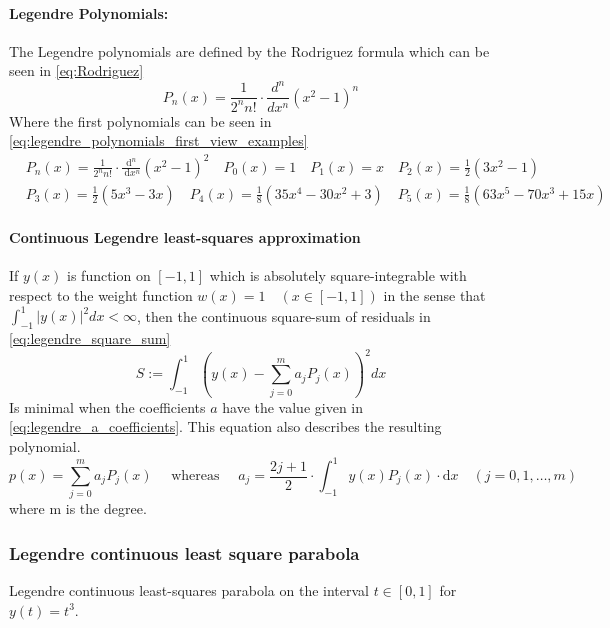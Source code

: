 \paragraph{Legendre Polynomials:}
The Legendre polynomials are defined by the Rodriguez formula which can be seen in \autoref{eq:Rodriguez}
\begin{equation}\label{eq:Rodriguez}
P_n(x)=\frac{1}{2^n n !} \cdot \frac{d^n}{d x^n}\left(x^2-1\right)^n
\end{equation}
Where the first polynomials can be seen in \autoref{eq:legendre_polynomials_first_view_examples}
\begin{equation}\label{eq:legendre_polynomials_first_view_examples}
    \begin{aligned}
    & P_{n}(x)=\frac{1}{2^{n} n !} \cdot \frac{\mathrm{d}^{n}}{\mathrm{~d} x^{n}}\left(x^{2}-1\right)^{2} \quad P_{0}(x)=1 \quad P_{1}(x)=x \quad P_{2}(x)=\frac{1}{2}\left(3 x^{2}-1\right) \\
    & P_{3}(x)=\frac{1}{2}\left(5 x^{3}-3 x\right) \quad P_{4}(x)=\frac{1}{8}\left(35 x^{4}-30 x^{2}+3\right) \quad P_{5}(x)=\frac{1}{8}\left(63 x^{5}-70 x^{3}+15 x\right)
    \end{aligned}
\end{equation}

\paragraph{Continuous Legendre least-squares approximation}\mbox{}\newline
If $y(x)$ is function on $[-1,1]$ which is absolutely square-integrable with respect to the weight function $w(x)=1 \quad(x \in[-1,1])$ in the sense that $\int_{-1}^1|y(x)|^2 d x<\infty$, then the continuous square-sum of residuals in \autoref{eq:legendre_square_sum}
\begin{equation}\label{eq:legendre_square_sum}
S:=\int_{-1}^1\left(y(x)-\sum_{j=0}^m a_j P_j(x)\right)^2 d x
\end{equation}
Is minimal when the coefficients $a$ have the value given in \autoref{eq:legendre_a_coefficients}. This equation also describes the resulting polynomial.
\begin{equation}\label{eq:legendre_a_coefficients}
p(x)=\sum_{j=0}^{m} a_{j} P_{j}(x) \quad \text { whereas } \quad a_{j}=\frac{2 j+1}{2} \cdot \int_{-1}^{1} y(x) P_{j}(x) \cdot \mathrm{d} x \quad(j=0,1, \ldots, m)
\end{equation}
where m is the degree.
\subsubsection{Legendre continuous least square parabola}
Legendre continuous least-squares parabola on the interval $t \in[0,1]$ for $y(t)=t^3$.\newline\newline

